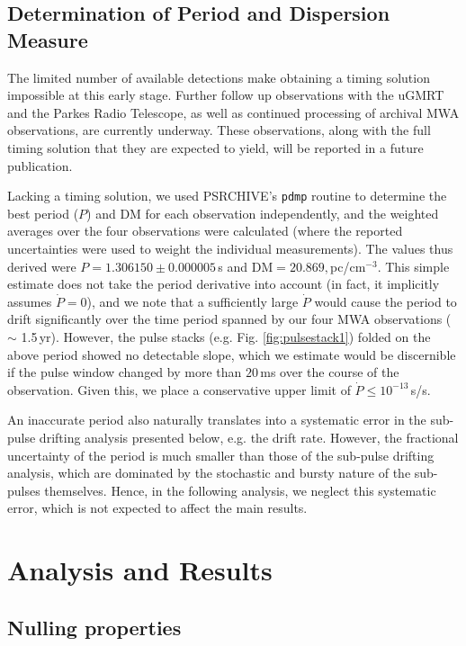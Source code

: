 \documentclass[twocolumn]{aastex631}
\begin{document}
\subsection{Determination of Period and Dispersion Measure}
\label{sec:period}

The limited number of available detections make obtaining a timing solution impossible at this early stage.
Further follow up observations with the uGMRT and the Parkes Radio Telescope, as well as continued processing of archival MWA observations, are currently underway. These observations, along with the full timing solution that they are expected to yield, will be reported in a future publication.

Lacking a timing solution, we used PSRCHIVE's \texttt{pdmp} routine to determine the best period ($P$) and DM for each observation independently, and the weighted averages over the four observations were calculated (where the reported uncertainties were used to weight the individual measurements).
The values thus derived were $P = 1.306150 \pm 0.000005\,$s and $\text{DM} = 20.869,$pc/cm$^{-3}$.
This simple estimate does not take the period derivative into account (in fact, it implicitly assumes $\dot{P} = 0$), and we note that a sufficiently large $\dot{P}$ would cause the period to drift significantly over the time period spanned by our four MWA observations ($\sim$ 1.5\,yr).
However, the pulse stacks (e.g. Fig. \ref{fig:pulsestack1}) folded on the above period showed no detectable slope, which we estimate would be discernible if the pulse window changed by more than $20\,$ms over the course of the observation.
Given this, we place a conservative upper limit of $\dot{P} \le 10^{-13}$\,s/s.

An inaccurate period also naturally translates into a systematic error in the sub-pulse drifting analysis presented below, e.g. the drift rate.
However, the fractional uncertainty of the period is much smaller than those of the sub-pulse drifting analysis, which are dominated by the stochastic and bursty nature of the sub-pulses themselves.
Hence, in the following analysis, we neglect this systematic error, which is not expected to affect the main results.

\section{Analysis and Results}
\label{sec:analysis}

\subsection{Nulling properties}
\label{sec:nulling}
\end{document}
